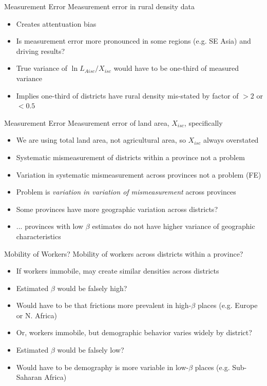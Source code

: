 \documentclass[10pt, xcolor=dvipsnames]{beamer}
\begin{document}
\begin{frame}{Measurement Error}
Measurement error in rural density data
\begin{itemize}
  \item Creates attentuation bias
  \item Is measurement error more pronounced in some regions (e.g. SE Asia) and driving results?
  \item True variance of $\ln L_{Aisc}/X_{isc}$ would have to be one-third of measured variance
  \item Implies one-third of districts have rural density mis-stated by factor of $>2$ or $<0.5$
\end{itemize}
\end{frame}

\begin{frame}{Measurement Error}
Measurement error of land area, $X_{isc}$, specifically
\begin{itemize}
  \item We are using total land area, not agricultural area, so $X_{isc}$ always overstated
  \item Systematic mismeasurement of districts within a province not a problem
  \item Variation in systematic mismeasurement across provinces not a problem (FE)
  \item Problem is \textit{variation in variation of mismeasurement} across provinces
  \item Some provinces have more geographic variation across districts?
  \item ... provinces with low $\beta$ estimates do not have higher variance of geographic characteristics
\end{itemize}
\end{frame}

\begin{frame}{Mobility of Workers?}
Mobility of workers across districts within a province?
\begin{itemize}
  \item<1-> If workers immobile, may create similar densities across districts
  \item<1-> Estimated $\beta$ would be falsely high?
  \item<1-> Would have to be that frictions more prevalent in high-$\beta$ places (e.g. Europe or N. Africa)
  \item<2-> Or, workers immobile, but demographic behavior varies widely by district?
  \item<2-> Estimated $\beta$ would be falsely low? 
  \item<2-> Would have to be demography is more variable in low-$\beta$ places (e.g. Sub-Saharan Africa)
\end{itemize}
\end{frame}
\end{document}
